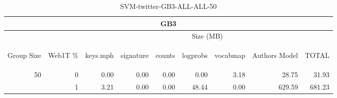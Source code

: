 \begin{center}
\begin{table}[htbp] 
 \begin{center}
\begin{tabular}{ | r | r | r | r | r | r | r | r | r |}
\hline
\multicolumn{9}{|c|}{GB3}\\
\hline
 & & \multicolumn{7}{|c|}{Size (MB)}\\ \cline{3-9}
\begin{sideways}Group Size\end{sideways} & \begin{sideways}Web1T \% \end{sideways} & \begin{sideways}keys.mph\end{sideways} & \begin{sideways}signature\end{sideways} & \begin{sideways}counts\end{sideways} & \begin{sideways}logprobs\end{sideways} & \begin{sideways}vocabmap\end{sideways} & \begin{sideways}Authors Model \end{sideways} & \begin{sideways}TOTAL\end{sideways}\\
\hline
\multirow{1}{*}{50}
 & 0 & 0.00 & 0.00 & 0.00 & 0.00 & 3.18 & 28.75 & 31.93\\ \cline{2-9}
 & 1 & 3.21 & 0.00 & 0.00 & 48.44 & 0.00 & 629.59 & 681.23\\ \cline{2-9}
\hline
\end{tabular}
\caption{SVM-twitter-GB3-ALL-ALL-50}
\label{table:SVM-twitter-GB3-ALL-ALL-50}
\end{center}
 \end{table}
\end{center}

